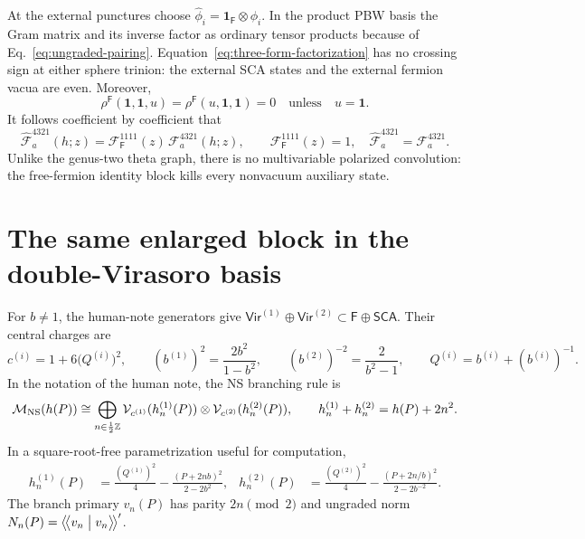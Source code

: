 \documentclass[11pt]{article}
\newcommand{\SCA}{\mathsf{SCA}}
\newcommand{\Ff}{\mathsf F}
\newcommand{\Vir}{\mathsf{Vir}}
\newcommand{\one}{\mathbf 1}
\newcommand{\cF}{\mathcal F}
\newcommand{\bpz}[2]{\bigl\langle\!\bigl\langle #1\bigm|#2\bigr\rangle\!\bigr\rangle}
\begin{document}
At the external punctures choose
\(\widehat\phi_i=\one_{\Ff}\otimes\phi_i\).  In the product PBW basis the
Gram matrix and its inverse factor as ordinary tensor products because of
Eq.~\eqref{eq:ungraded-pairing}.  Equation~\eqref{eq:three-form-factorization}
has no crossing sign at either sphere trinion: the external SCA states and
the external fermion vacua are even.  Moreover,
\begin{equation}
 \rho^{\Ff}(\one,\one,u)=\rho^{\Ff}(u,\one,\one)=0
 \quad\text{unless}\quad u=\one.
 \label{eq:fermion-identity-selection}
\end{equation}
It follows coefficient by coefficient that
\begin{equation}
 \widehat{\cF}_a^{4321}(h;z)
 =\cF_{\Ff}^{1111}(z)\,\cF_a^{4321}(h;z),
 \qquad
 \boxed{\cF_{\Ff}^{1111}(z)=1,\quad
 \widehat{\cF}_a^{4321}=\cF_a^{4321}.}
 \label{eq:sphere-factorization}
\end{equation}
Unlike the genus-two theta graph, there is no multivariable polarized
convolution: the free-fermion identity block kills every nonvacuum
auxiliary state.

\section{The same enlarged block in the double-Virasoro basis}

For \(b\ne1\), the human-note generators give
\(\Vir^{(1)}\oplus\Vir^{(2)}\subset\Ff\oplus\SCA\).  Their central charges
are
\begin{equation}
 c^{(i)}=1+6\bigl(Q^{(i)}\bigr)^2,
 \qquad
 (b^{(1)})^2=\frac{2b^2}{1-b^2},
 \qquad
 (b^{(2)})^{-2}=\frac{2}{b^2-1},
 \qquad Q^{(i)}=b^{(i)}+(b^{(i)})^{-1}.
 \label{eq:double-central-charges}
\end{equation}
In the notation of the human note, the NS branching rule is
\begin{equation}
 \mathcal M_{\rm NS}(h(P))
 \cong\bigoplus_{n\in\frac12\mathbb Z}
 \mathcal V_{c^{(1)}}(h_n^{(1)}(P))\otimes
 \mathcal V_{c^{(2)}}(h_n^{(2)}(P)),
 \qquad
 h_n^{(1)}+h_n^{(2)}=h(P)+2n^2.
 \label{eq:branching-rule}
\end{equation}
In a square-root-free parametrization useful for computation,
\begin{align}
 h_n^{(1)}(P)
 &=\frac{(Q^{(1)})^2}{4}
 -\frac{(P+2nb)^2}{2-2b^2},
 &
 h_n^{(2)}(P)
 &=\frac{(Q^{(2)})^2}{4}
 -\frac{(P+2n/b)^2}{2-2b^{-2}}.
 \label{eq:branch-weights}
\end{align}
The branch primary \(v_n(P)\) has parity \(2n\pmod2\) and ungraded norm
\(N_n(P)=\bpz{v_n}{v_n}'\).
\end{document}
